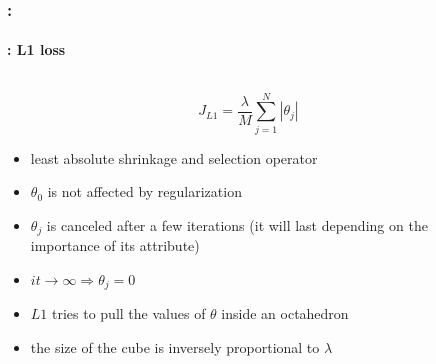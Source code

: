 \documentclass[xcolor=table]{beamer}%
\begin{document}
\begin{frame}
	\frametitle{\insertshortsubtitle: \insertsection}
	\framesubtitle{\insertsubsection: L1 loss}
	
	\begin{columns}
		\begin{column}{.64\textwidth}
			\[J_{L1} = \frac{\lambda}{M} \sum_{j=1}^{N} |\theta_j|\]
	
			\begin{itemize}
				\item least absolute shrinkage and selection operator
				\item $\theta_0$ is not affected by regularization
				\item $\theta_j$ is canceled after a few iterations (it will last depending on the importance of its attribute)
				\item $it \rightarrow \infty \Rightarrow \theta_j = 0$
				\item $L1$ tries to pull the values of $\theta$ inside an octahedron
				\item the size of the cube is inversely proportional to $\lambda$
			\end{itemize}
		\end{column}
		\begin{column}{.35\textwidth}
		\end{column}
	\end{columns}
	
\end{frame}
\end{document}
